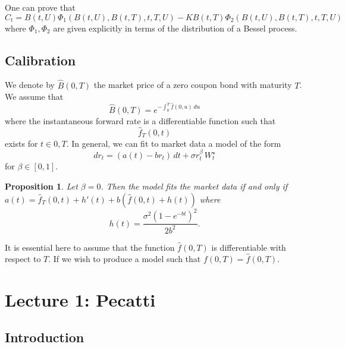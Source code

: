 \documentclass[10pt, oneside, reqno]{amsbook}
\theoremstyle{plain}%
\newtheorem{prop}[thm]{Proposition}
\theoremstyle{definition}
\theoremstyle{rem}
\theoremstyle{definition}
\numberwithin{equation}{chapter}
\begin{document}
One can prove that \[
    C_t = B(t, U) \Phi_1(B(t, U), B(t, T), t, T, U) - K B(t, T) \Phi_2(B(t, U), B(t, T), t, T, U)
\] where $\Phi_1, \Phi_2$ are given explicitly in terms of the distribution of a Bessel process.

\section{Calibration} %
\label{sub:calibration}

We denote by $\hat B(0, T)$ the market price of a zero coupon bond with maturity $T$.  We assume that \[
    \hat B(0, T) = e^{- \int_0^T \hat f(0, u) \, du}
\] where the instantaneous forward rate  is a differentiable function such that \[
    \hat f_T(0, t) 
\] exists for $t \in 0, T$.  In general, we can fit to market data a model of the form \[
    dr_t = (a(t) - br_t) \, dt + \sigma r_t^\beta \, W^\star_t
\] for $\beta \in [0, 1]$.  

\begin{prop}
    Let $\beta = 0$. Then the model fits the market data if and only if $a(t) = \hat f_T(0, t) + h'(t) + b(\hat f(0, t) + h(t))$ where \[
        h(t) = \frac{\sigma^2\left(1-e^{-bt}\right)^2}{2b^2}.
    \]
\end{prop}
It is essential here to assume that the function $\hat f(0, T)$ is differentiable with respect to $T$.  If we wish to produce a model such that $f(0, T) = \hat f(0, T)$.

\chapter{Lecture 1: Pecatti}
\section{Introduction}
\end{document}
